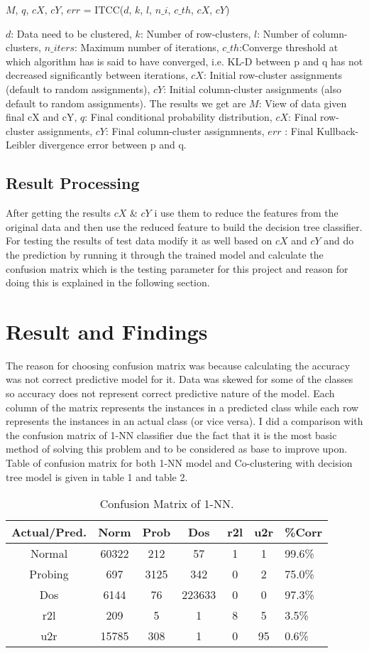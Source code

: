 \documentclass{acm_proc_article-sp}
\begin{document}
$M$, $q$, $cX$, $cY$, $err$  = ITCC($d$, $k$, $l$, $n\_i$, $c\_th$, $cX$, $cY$)


$d$: Data need to be clustered, $k$: Number of row-clusters, $l$: Number of column-clusters, $n\_iters$: Maximum number of iterations, $c\_th$:Converge threshold at which algorithm has is said to have converged, i.e. KL-D between p and q has not decreased significantly between iterations, $cX$: Initial row-cluster assignments (default to random assignments), $cY$: Initial column-cluster assignments (also default to random assignments). The results we get are $M$: View of data given final cX and cY, $q$: Final conditional probability distribution, $cX$: Final row-cluster assignments, $cY$: Final column-cluster assignmnents, $err$ : Final Kullback-Leibler divergence error between p and q.

\subsection{Result Processing}
After getting the results $cX$ \& $cY$ i use them to reduce the features from the original data and then use the reduced feature to build the decision tree classifier. For testing the results of test data modify it as well based on $cX$ and $cY$ and do the prediction by running it through the trained model and calculate the confusion matrix which is the testing parameter for this project and reason for doing this is explained in the following section.

\section{Result and Findings}
The reason for choosing confusion matrix was because calculating the accuracy was not correct predictive model for it. Data was skewed for some of the classes so accuracy does not represent correct predictive nature of the model. Each column of the matrix represents the instances in a predicted class while each row represents the instances in an actual class (or vice versa). I did a comparison with the confusion matrix of 1-NN classifier due the fact that it is the most basic method of solving this problem and to be considered as base to improve upon. Table of confusion matrix for both 1-NN model and Co-clustering with decision tree model is given in table 1 and table 2. 

\begin{table}
	\centering
	\caption{Confusion Matrix of 1-NN.}
	\begin{tabular}{|c|c|c|c|c|c|l|} \hline
		Actual/Pred.&Norm&Prob&Dos&r2l&u2r&\%Corr\\ \hline
		Normal&60322&212&57&1&1&99.6\% \\ \hline
		Probing&697&3125&342&0&2&75.0\% \\ \hline
		Dos&6144&76&223633&0&0&97.3\% \\ \hline
		r2l&209&5&1&8&5&3.5\% \\ \hline
		u2r&15785&308&1&0&95&0.6\% \\ \hline
	\end{tabular}
\end{table}
\end{document}
